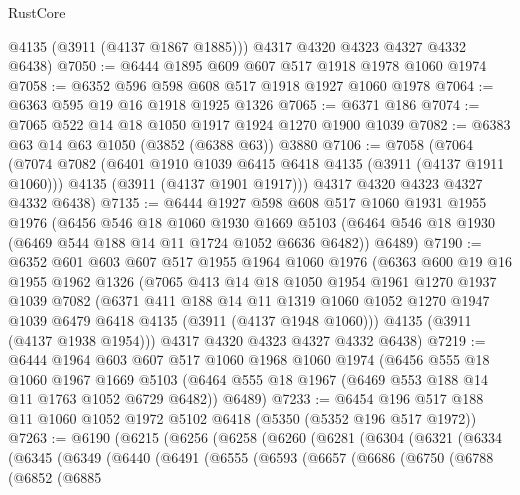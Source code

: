 \begin{lexlean}{RustCore}
\begin{coremodule}
        @4135
        (@3911 (@4137 @1867 @1885)))
      @4317
      @4320
      @4323
      @4327
      @4332
      @6438)
@7050 := @6444 @1895 @609 @607 @517 @1918 @1978 @1060 @1974
@7058 := @6352 @596 @598 @608 @517 @1918 @1927 @1060 @1978
@7064 := @6363 @595 @19 @16 @1918 @1925 @1326
@7065 := @6371 @186
@7074 := @7065 @522 @14 @18 @1050 @1917 @1924 @1270 @1900 @1039
@7082 := @6383 @63 @14 @63 @1050 (@3852 (@6388 @63)) @3880
@7106 := @7058
    (@7064
      (@7074
        @7082
        (@6401 @1910 @1039 @6415 @6418 @4135 (@3911 (@4137 @1911 @1060)))
        @4135
        (@3911 (@4137 @1901 @1917)))
      @4317
      @4320
      @4323
      @4327
      @4332
      @6438)
@7135 := @6444
    @1927
    @598
    @608
    @517
    @1060
    @1931
    @1955
    @1976
    (@6456
      @546
      @18
      @1060
      @1930
      @1669
      @5103
      (@6464 @546 @18 @1930 (@6469 @544 @188 @14 @11 @1724 @1052 @6636 @6482))
      @6489)
@7190 := @6352
    @601
    @603
    @607
    @517
    @1955
    @1964
    @1060
    @1976
    (@6363
      @600
      @19
      @16
      @1955
      @1962
      @1326
      (@7065
        @413
        @14
        @18
        @1050
        @1954
        @1961
        @1270
        @1937
        @1039
        @7082
        (@6371
          @411
          @188
          @14
          @11
          @1319
          @1060
          @1052
          @1270
          @1947
          @1039
          @6479
          @6418
          @4135
          (@3911 (@4137 @1948 @1060)))
        @4135
        (@3911 (@4137 @1938 @1954)))
      @4317
      @4320
      @4323
      @4327
      @4332
      @6438)
@7219 := @6444
    @1964
    @603
    @607
    @517
    @1060
    @1968
    @1060
    @1974
    (@6456
      @555
      @18
      @1060
      @1967
      @1669
      @5103
      (@6464 @555 @18 @1967 (@6469 @553 @188 @14 @11 @1763 @1052 @6729 @6482))
      @6489)
@7233 := @6454 @196 @517 @188 @11 @1060 @1052 @1972 @5102 @6418 (@5350 (@5352 @196 @517 @1972))
@7263 := @6190
    (@6215
      (@6256
        (@6258
          (@6260
            (@6281
              (@6304
                (@6321
                  (@6334
                    (@6345
                      (@6349
                        (@6440
                          (@6491
                            (@6555
                              (@6593
                                (@6657
                                  (@6686
                                    (@6750
                                      (@6788
                                        (@6852
                                          (@6885

\end{coremodule}
\end{lexlean}
